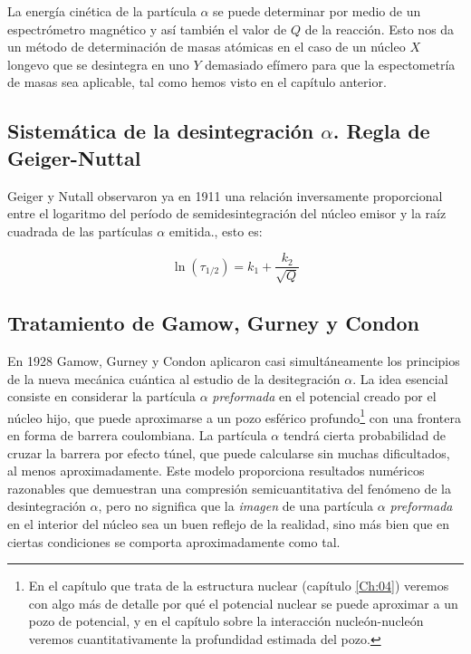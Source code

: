 La energía cinética de la partícula $\alpha$ se puede determinar por medio de un espectrómetro magnético y así también el valor de $Q$ de la reacción. Esto nos da un método de determinación de masas atómicas en el caso de un núcleo $X$ longevo que se desintegra en uno $Y$ demasiado efímero para que la espectometría de masas sea aplicable, tal como hemos visto en el capítulo anterior.

\subsection{Sistemática de la desintegración $\alpha$. Regla de Geiger-Nuttal}

Geiger y Nutall observaron ya en 1911 una relación inversamente proporcional entre el logaritmo del período de semidesintegración del núcleo emisor y la raíz cuadrada de las partículas $\alpha$ emitida., esto es:

\begin{mybox}
\begin{equation}
\ln (\tau_{1/2}) = k_1 + \frac{k_2}{\sqrt{Q}}
\end{equation}
\end{mybox}

\subsection{Tratamiento de Gamow, Gurney y Condon}

En 1928 Gamow, Gurney y Condon aplicaron casi simultáneamente los principios de la nueva mecánica cuántica al estudio de la desitegración $\alpha$. La idea esencial consiste en considerar la partícula $\alpha$ \textit{preformada} en el potencial creado por el núcleo hijo, que puede aproximarse a un pozo esférico profundo\footnote{En el capítulo que trata de la estructura nuclear (capítulo \ref{Ch:04}) veremos con algo más de detalle por qué el potencial nuclear se puede aproximar a un pozo de potencial, y en el capítulo sobre la interacción nucleón-nucleón veremos cuantitativamente la profundidad estimada del pozo.} con una frontera en forma de barrera coulombiana. La partícula $\alpha$ tendrá cierta probabilidad de cruzar la barrera por efecto túnel, que puede calcularse sin muchas dificultados, al menos aproximadamente. Este modelo proporciona resultados numéricos razonables que demuestran una compresión semicuantitativa del fenómeno de la desintegración $\alpha$, pero no significa que la \textit{imagen} de una partícula $\alpha$ \textit{preformada} en el interior del núcleo sea un buen reflejo de la realidad, sino más bien que en ciertas condiciones se comporta aproximadamente como tal.

